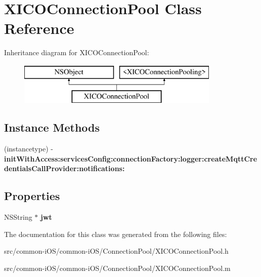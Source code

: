 \hypertarget{interface_x_i_c_o_connection_pool}{}\section{X\+I\+C\+O\+Connection\+Pool Class Reference}
\label{interface_x_i_c_o_connection_pool}
Inheritance diagram for X\+I\+C\+O\+Connection\+Pool\+:\begin{figure}[H]
\begin{center}
\leavevmode
\includegraphics[height=2.000000cm]{interface_x_i_c_o_connection_pool}
\end{center}
\end{figure}
\subsection*{Instance Methods}
\begin{DoxyCompactItemize}
\item 
\hypertarget{interface_x_i_c_o_connection_pool_abfe617db5ce7dda3cfd75de79582d2e4}{}\label{interface_x_i_c_o_connection_pool_abfe617db5ce7dda3cfd75de79582d2e4} 
(instancetype) -\/ {\bfseries init\+With\+Access\+:services\+Config\+:connection\+Factory\+:logger\+:create\+Mqtt\+Credentials\+Call\+Provider\+:notifications\+:}
\end{DoxyCompactItemize}
\subsection*{Properties}
\begin{DoxyCompactItemize}
\item 
\hypertarget{interface_x_i_c_o_connection_pool_a3751d5aa0bf34f3bdc686d08873fdcd7}{}\label{interface_x_i_c_o_connection_pool_a3751d5aa0bf34f3bdc686d08873fdcd7} 
N\+S\+String $\ast$ {\bfseries jwt}
\end{DoxyCompactItemize}


The documentation for this class was generated from the following files\+:\begin{DoxyCompactItemize}
\item 
src/common-\/i\+O\+S/common-\/i\+O\+S/\+Connection\+Pool/X\+I\+C\+O\+Connection\+Pool.\+h\item 
src/common-\/i\+O\+S/common-\/i\+O\+S/\+Connection\+Pool/X\+I\+C\+O\+Connection\+Pool.\+m\end{DoxyCompactItemize}
